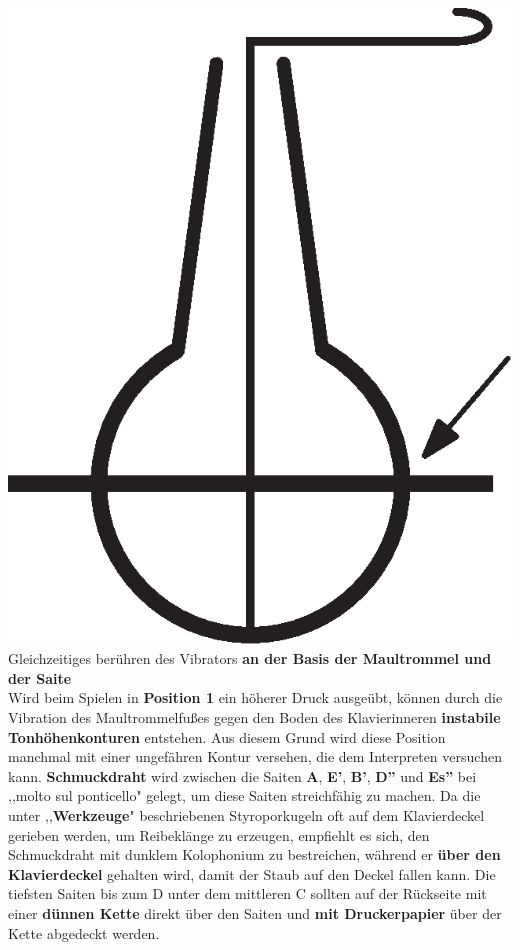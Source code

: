 \documentclass[12pt]{article}
\newcommand*\circled[1]{\tikz[baseline=(char.base)]{
            \node[shape=circle,draw,inner sep=1pt] (char) {#1};}}
\begin{document}
\includegraphics[scale=0.17]{string.eps}
\circled{3} Gleichzeitiges berühren des Vibrators \textbf{an der Basis der Maultrommel und der Saite} \\

Wird beim Spielen in \textbf{Position 1} ein höherer Druck ausgeübt, können durch die Vibration des Maultrommelfußes gegen den Boden des Klavierinneren \textbf{instabile Tonhöhenkonturen} entstehen. Aus diesem Grund wird diese Position manchmal mit einer ungefähren Kontur versehen, die dem Interpreten versuchen kann. \textbf{\circled{4} Schmuckdraht} wird zwischen die Saiten \textbf{A}, \textbf{E'}, \textbf{B'}, \textbf{D''} und \textbf{Es''} bei ,,molto sul ponticello" gelegt, um diese Saiten streichfähig zu machen. Da die unter ,,\textbf{Werkzeuge}" beschriebenen Styroporkugeln oft auf dem Klavierdeckel gerieben werden, um Reibeklänge zu erzeugen, empfiehlt es sich, den Schmuckdraht mit dunklem Kolophonium zu bestreichen, während er \textbf{über den Klavierdeckel} gehalten wird, damit der Staub auf den Deckel fallen kann. \textbf{\circled{5}} Die tiefsten Saiten bis zum D unter dem mittleren C sollten auf der Rückseite mit einer \textbf{dünnen Kette} direkt über den Saiten und \textbf{mit Druckerpapier} über der Kette abgedeckt werden.
\endgroup
\end{document}
